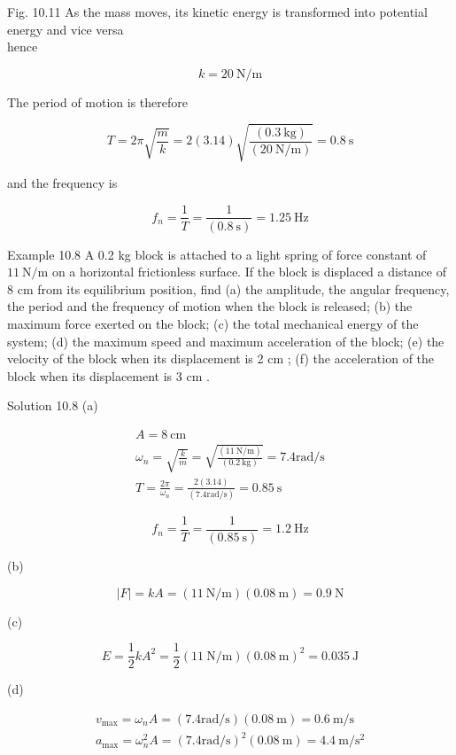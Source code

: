 \documentclass[10pt]{article}
\begin{document}
Fig. 10.11 As the mass moves, its kinetic energy is transformed into potential energy and vice versa\\
hence

$$
k=20 \mathrm{~N} / \mathrm{m}
$$

The period of motion is therefore

$$
T=2 \pi \sqrt{\frac{m}{k}}=2(3.14) \sqrt{\frac{(0.3 \mathrm{~kg})}{(20 \mathrm{~N} / \mathrm{m})}}=0.8 \mathrm{~s}
$$

and the frequency is

$$
f_{n}=\frac{1}{T}=\frac{1}{(0.8 \mathrm{~s})}=1.25 \mathrm{~Hz}
$$

Example 10.8 A 0.2 kg block is attached to a light spring of force constant of $11 \mathrm{~N} / \mathrm{m}$ on a horizontal frictionless surface. If the block is displaced a distance of 8 cm from its equilibrium position, find (a) the amplitude, the angular frequency, the period and the frequency of motion when the block is released; (b) the maximum force exerted on the block; (c) the total mechanical energy of the system; (d) the maximum speed and maximum acceleration of the block; (e) the velocity of the block when its displacement is 2 cm ; (f) the acceleration of the block when its displacement is 3 cm .

Solution 10.8 (a)

$$
\begin{gathered}
A=8 \mathrm{~cm} \\
\omega_{n}=\sqrt{\frac{k}{m}}=\sqrt{\frac{(11 \mathrm{~N} / \mathrm{m})}{(0.2 \mathrm{~kg})}}=7.4 \mathrm{rad} / \mathrm{s} \\
T=\frac{2 \pi}{\omega_{n}}=\frac{2(3.14)}{(7.4 \mathrm{rad} / \mathrm{s})}=0.85 \mathrm{~s}
\end{gathered}
$$

$$
f_{n}=\frac{1}{T}=\frac{1}{(0.85 \mathrm{~s})}=1.2 \mathrm{~Hz}
$$

(b)

$$
|F|=k A=(11 \mathrm{~N} / \mathrm{m})(0.08 \mathrm{~m})=0.9 \mathrm{~N}
$$

(c)

$$
E=\frac{1}{2} k A^{2}=\frac{1}{2}(11 \mathrm{~N} / \mathrm{m})(0.08 \mathrm{~m})^{2}=0.035 \mathrm{~J}
$$

(d)

$$
\begin{gathered}
v_{\max }=\omega_{n} A=(7.4 \mathrm{rad} / \mathrm{s})(0.08 \mathrm{~m})=0.6 \mathrm{~m} / \mathrm{s} \\
a_{\max }=\omega_{n}^{2} A=(7.4 \mathrm{rad} / \mathrm{s})^{2}(0.08 \mathrm{~m})=4.4 \mathrm{~m} / \mathrm{s}^{2}
\end{gathered}
$$
\end{document}
